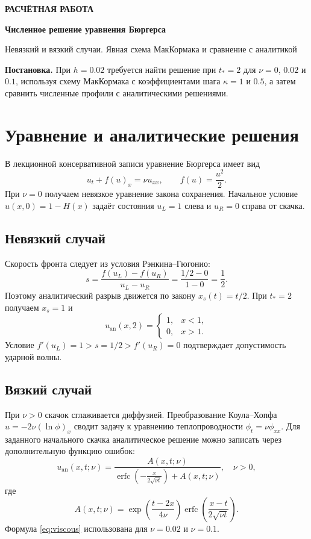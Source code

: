 \documentclass[11pt,a4paper]{article}
\begin{document}
\begin{center}
{\sffamily\small\color{teal}\bfseries РАСЧЁТНАЯ РАБОТА}\par\vspace{3pt}
{\sffamily\LARGE\bfseries\color{navy} Численное решение уравнения Бюргерса}\par\vspace{5pt}
{\small Невязкий и вязкий случаи. Явная схема МакКормака и сравнение с аналитикой}
\end{center}
\vspace{2mm}
\begin{notebox}
\textbf{Постановка.} При $h=0.02$ требуется найти решение при $t_*=2$ для $\nu=0$, $0.02$ и $0.1$, используя схему МакКормака с коэффициентами шага $\kappa=1$ и $0.5$, а затем сравнить численные профили с аналитическими решениями.
\end{notebox}

\section{Уравнение и аналитические решения}

В лекционной консервативной записи уравнение Бюргерса имеет вид
\begin{equation}\label{eq:burgers}
u_t+f(u)_x=\nu u_{xx},\qquad f(u)=\frac{u^2}{2}.
\end{equation}
При $\nu=0$ получаем невязкое уравнение закона сохранения. Начальное условие $u(x,0)=1-H(x)$ задаёт состояния $u_L=1$ слева и $u_R=0$ справа от скачка.

\subsection{Невязкий случай}
Скорость фронта следует из условия Рэнкина--Гюгонио:
\[
s=\frac{f(u_L)-f(u_R)}{u_L-u_R}=\frac{1/2-0}{1-0}=\frac12.
\]
Поэтому аналитический разрыв движется по закону $x_s(t)=t/2$. При $t_*=2$ получаем $x_s=1$ и
\[
u_{\mathrm{an}}(x,2)=\begin{cases}1,&x<1,\\0,&x>1.\end{cases}
\]
Условие $f'(u_L)=1>s=1/2>f'(u_R)=0$ подтверждает допустимость ударной волны.

\subsection{Вязкий случай}
При $\nu>0$ скачок сглаживается диффузией. Преобразование Коула--Хопфа $u=-2\nu(\ln\phi)_x$ сводит задачу к уравнению теплопроводности $\phi_t=\nu\phi_{xx}$. Для заданного начального скачка аналитическое решение можно записать через дополнительную функцию ошибок:
\begin{equation}\label{eq:viscous}
u_{\mathrm{an}}(x,t;\nu)=\frac{A(x,t;\nu)}{\operatorname{erfc}\!\left(-\frac{x}{2\sqrt{\nu t}}\right)+A(x,t;\nu)},\quad \nu>0,
\end{equation}
где
\[
A(x,t;\nu)=\exp\!\left(\frac{t-2x}{4\nu}\right)\operatorname{erfc}\!\left(\frac{x-t}{2\sqrt{\nu t}}\right).
\]
Формула \eqref{eq:viscous} использована для $\nu=0.02$ и $\nu=0.1$.
\end{document}

